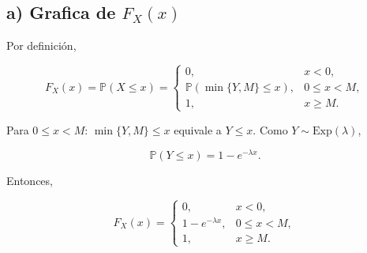 \documentclass[10pt,a4paper]{article}
\begin{document}
    \begin{center}
    \end{center}
    { \hspace*{\fill} \\}
    
    \hypertarget{a-grafica-de-f_xx}{%
\subsection{\texorpdfstring{a) Grafica de
\(F_X(x)\)}{a) Grafica de F\_X(x)}}\label{a-grafica-de-f_xx}}

    Por definición,

\[
F_X(x)=\mathbb P(X\le x)=
\begin{cases}
0,&x<0,\\[2pt]
\mathbb P(\min\{Y,M\}\le x),&0\le x<M,\\[2pt]
1,&x\ge M.
\end{cases}
\]

Para \(0\le x<M\): \(\min\{Y,M\}\le x\) equivale a \(Y\le x\). Como
\(Y\sim\mathrm{Exp}(\lambda)\),

\[
\mathbb P(Y\le x)=1-e^{-\lambda x}.
\]

Entonces,

\[
F_X(x)=
\begin{cases}
0,&x<0,\\
1-e^{-\lambda x},&0\le x<M,\\
1,&x\ge M.
\end{cases}
\]
\end{document}
